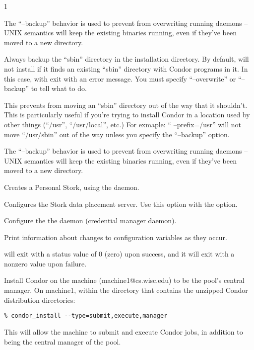 \begin{ManPage}{\label{man-condor-configure}}{1}
\begin{Options}
{	  The ``--backup'' behavior is used to
	  prevent  from overwriting running daemons --
	  UNIX semantics will keep the existing binaries running, even
	  if they've been moved to a new directory.}

	 {
	  Always backup the ``sbin'' directory in the installation
	  directory.  By default,  will not install if
	  it finds an existing ``sbin'' directory with Condor programs
	  in it.  In this case,  with exit with an
	  error message.  You must specify ``--overwrite'' or
	  ``--backup'' to tell  what to do.

	  This prevents  from moving an ``sbin''
	  directory out of the way that it shouldn't.  This is
	  particularly useful if you're trying to install Condor in a
	  location used by other things (``/usr'', ``/usr/local'', etc.)
	  For exmaple: `` --prefix=/usr'' will not move
	  ``/usr/sbin'' out of the way unless you specify the
	  ``--backup'' option.

	  The ``--backup'' behavior is used to
	  prevent  from overwriting running daemons --
	  UNIX semantics will keep the existing binaries running, even
	  if they've been moved to a new directory. }

	 {Creates a 
	  Personal Stork, using the  daemon.}

	 {Configures the 
	  Stork data placement server.
	  Use this option with the  option.}

	 {Configure the
	  the  daemon (credential manager daemon).}

	 {Print information about changes
	to configuration variables as they occur.}
\end{Options}

\ExitStatus

 will exit with a status value of 0 (zero) upon success,
and it will exit with a nonzero value upon failure.

\Examples
Install Condor on the machine (machine1@cs.wisc.edu)
to be the pool's central manager.
On machine1,
within the directory that contains the unzipped Condor
distribution directories:
\footnotesize
\begin{verbatim}
% condor_install --type=submit,execute,manager
\end{verbatim}
\normalsize
This will allow the machine to submit and execute Condor jobs, 
in addition to being the central manager of the pool.



\end{ManPage}
